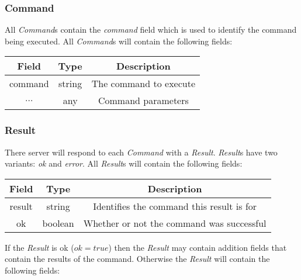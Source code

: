 \subsubsection{Command}
\label{sec:message:command}

All \emph{Command}s contain the \emph{command} field which is used to identify the command being executed.
All \emph{Command}s will contain the following fields:

\begin{table}[H]
    \begin{center}
        \begin{tabular}{|c|c|c|}\hline
            Field & Type & Description \\\hline
            command & string & The command to execute \\\hline
            $\ldots$ & any & Command parameters \\\hline
        \end{tabular}
    \end{center}
\end{table}

\subsubsection{Result}
\label{sec:message:result}

There server will respond to each \emph{Command} with a \emph{Result}. \emph{Result}s have two 
variants: \emph{ok} and \emph{error}. All \emph{Result}s will contain the following fields:

\begin{table}[H]
    \begin{center}
        \begin{tabular}{|c|c|c|}\hline
            Field & Type & Description \\\hline
            result & string & Identifies the command this result is for \\\hline
            ok & boolean & Whether or not the command was successful \\\hline
        \end{tabular}
    \end{center}
\end{table}

If the \emph{Result} is ok ($ok = true$) then the \emph{Result} may contain addition fields
that contain the results of the command. Otherwise the \emph{Result} will contain the following fields:

